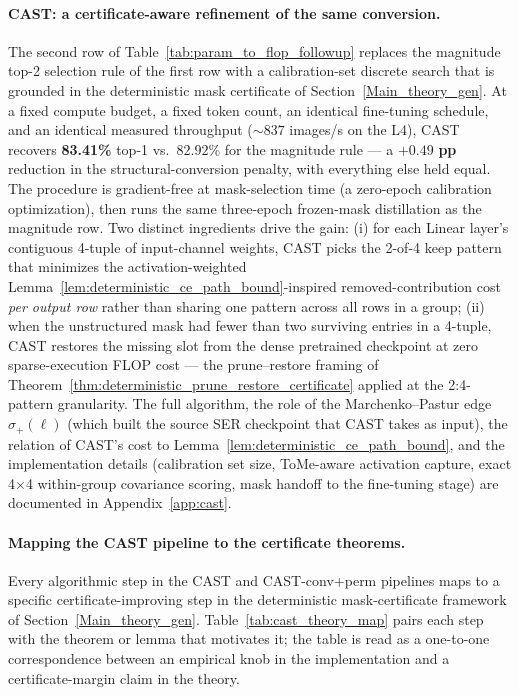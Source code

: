 \documentclass[11pt]{article}
\theoremstyle{plain}
\theoremstyle{definition}
\theoremstyle{remark}
\newcommand{\1}{\mathbf{1}}
\begin{document}
\paragraph{CAST: a certificate-aware refinement of the same conversion.}
The second row of Table~\ref{tab:param_to_flop_followup} replaces the magnitude top-2 selection rule of the first row with a calibration-set discrete search that is grounded in the deterministic mask certificate of Section~\ref{Main_theory_gen}.  At a fixed compute budget, a fixed token count, an identical fine-tuning schedule, and an identical measured throughput (\(\sim\!837\) images/s on the L4), CAST recovers \textbf{83.41\%} top-1 vs.\ \(82.92\%\) for the magnitude rule --- a \(\mathbf{+0.49}\) \textbf{pp} reduction in the structural-conversion penalty, with everything else held equal.  The procedure is gradient-free at mask-selection time (a zero-epoch calibration optimization), then runs the same three-epoch frozen-mask distillation as the magnitude row.  Two distinct ingredients drive the gain: (i) for each Linear layer's contiguous 4-tuple of input-channel weights, CAST picks the 2-of-4 keep pattern that minimizes the activation-weighted Lemma~\ref{lem:deterministic_ce_path_bound}-inspired removed-contribution cost \emph{per output row} rather than sharing one pattern across all rows in a group; (ii) when the unstructured mask had fewer than two surviving entries in a 4-tuple, CAST restores the missing slot from the dense pretrained checkpoint at zero sparse-execution FLOP cost --- the prune--restore framing of Theorem~\ref{thm:deterministic_prune_restore_certificate} applied at the 2:4-pattern granularity.  The full algorithm, the role of the Marchenko--Pastur edge \(\sigma_+(\ell)\) (which built the source SER checkpoint that CAST takes as input), the relation of CAST's cost to Lemma~\ref{lem:deterministic_ce_path_bound}, and the implementation details (calibration set size, ToMe-aware activation capture, exact 4\(\times\)4 within-group covariance scoring, mask handoff to the fine-tuning stage) are documented in Appendix~\ref{app:cast}.

\paragraph{Mapping the CAST pipeline to the certificate theorems.}
Every algorithmic step in the CAST and CAST-conv+perm pipelines maps to a specific certificate-improving step in the deterministic mask-certificate framework of Section~\ref{Main_theory_gen}.  Table~\ref{tab:cast_theory_map} pairs each step with the theorem or lemma that motivates it; the table is read as a one-to-one correspondence between an empirical knob in the implementation and a certificate-margin claim in the theory.
\end{document}
